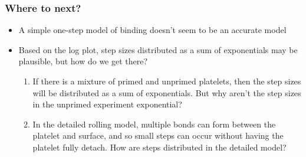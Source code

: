 \documentclass{beamer}
\begin{document}
\begin{frame}
  \frametitle{Where to next?}
  \begin{itemize}
  \item A simple one-step model of binding doesn't seem to be an
    accurate model
  \item Based on the log plot, step sizes distributed as a sum of
    exponentials may be plausible, but how do we get there?
    \begin{enumerate}
    \item If there is a mixture of primed and unprimed platelets, then
      the step sizes will be distributed as a sum of exponentials. But
      why aren't the step sizes in the unprimed experiment
      exponential?
    \item In the detailed rolling model, multiple bonds can form
      between the platelet and surface, and so small steps can occur
      without having the platelet fully detach. How are steps
      distributed in the detailed model?
    \end{enumerate}
  \end{itemize}
\end{frame}

\end{document}
